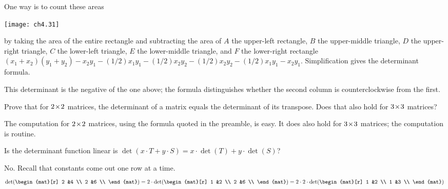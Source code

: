 \begin{exercises}
\begin{answer}
      One way is to count these areas
      \begin{center}
        \texttt{[image: ch4.31]}
      \end{center}
      by taking the area of the entire rectangle and subtracting the area of
      $A$ the upper-left rectangle, $B$ the upper-middle triangle,
      $D$ the upper-right triangle, $C$ the lower-left triangle, 
      $E$ the lower-middle triangle, and $F$ the lower-right rectangle       
      \( (x_1+x_2)(y_1+y_2)-x_2y_1-(1/2)x_1y_1-(1/2)x_2y_2
              -(1/2)x_2y_2-(1/2)x_1y_1-x_2y_1 \).
      Simplification gives the determinant formula.

      This determinant is the negative of the one above; the formula
      distinguishes whether the second column is counterclockwise from
      the first.  
     \end{answer}
  \item 
    Prove that for \( 2 \! \times \! 2 \) matrices, the determinant of a matrix
    equals the determinant of its transpose.
    Does that also hold for \( 3 \! \times \! 3 \) matrices?
    \begin{answer}
      The computation for \( 2 \! \times \! 2 \) matrices, using the
      formula quoted in the preamble, is easy.
      It does also hold for \( 3 \! \times \! 3 \) matrices; the 
      computation is routine.  
    \end{answer}
  \recommended \item 
    Is the determinant function linear \Dash  is
    \( \det(x\cdot T+y\cdot S)=x\cdot \det(T)+y\cdot \det(S) \)?
    \begin{answer}
      No.
      Recall that constants come out one row at a time.
      \begin{equation*}
         \det(
         \begin{mat}[r]
            2  &4  \\
            2  &6  \\
         \end{mat})
         =
         2\cdot\det(\begin{mat}[r]
            1  &2  \\
            2  &6  \\
         \end{mat})
         =
         2\cdot 2\cdot \det(\begin{mat}[r]
            1  &2  \\
            1  &3  \\
         \end{mat})

\end{equation*}
\end{answer}
\end{exercises}
